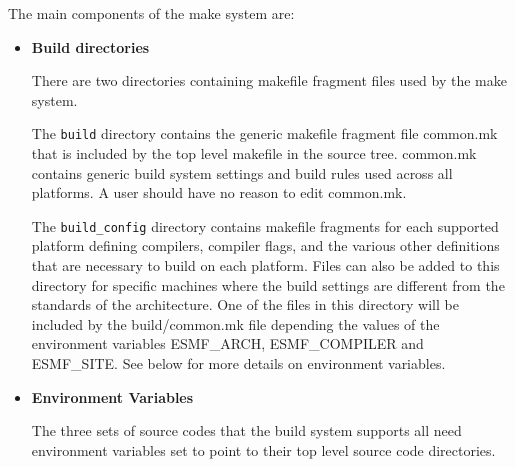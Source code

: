 The main components of the make system are:
\begin{itemize}
\item{{\bf Build directories}}

There are two directories containing makefile fragment files used by
the make system.  

The {\tt build} directory contains the generic makefile fragment file
common.mk that is included by the top level makefile in the source
tree.  common.mk contains generic build system settings and build
rules used across all platforms.  A user should have no reason to edit
common.mk.

The {\tt build\_config} directory contains makefile fragments for each
supported platform defining compilers, compiler flags, and the various
other definitions that are necessary to build on each platform.  Files
can also be added to this directory for specific machines where the
build settings are different from the standards of the architecture.
One of the files in this directory will be included by the
build/common.mk file depending the values of the environment variables
ESMF\_ARCH, ESMF\_COMPILER and ESMF\_SITE.  See below for more details
on environment variables.

\item{{\bf Environment Variables}}

The three sets of source codes that the build system supports all need
environment variables set to point to their top level source code
directories.

\end{itemize}
